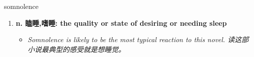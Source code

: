 
\begin{frame}
{\huge somnolence}
\begin{center}
\begin{enumerate}\Large
  \item \textbf{n. 瞌睡,嗜睡: the quality or state of desiring or needing sleep}
  \begin{itemize}
    \item \em{\Large{Somnolence is likely to be the most typical reaction to this novel. 读这部小说最典型的感受就是想睡觉。}}
  \end{itemize}
\end{enumerate}
\end{center}
\end{frame}
